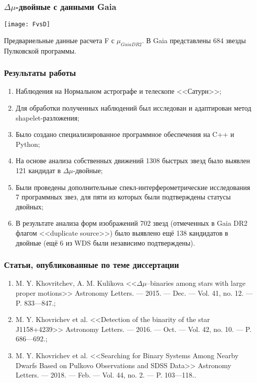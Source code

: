 \begin{frame}
\frametitle{$\Delta\mu$-двойные с данными Gaia}
\begin{center}
	\texttt{[image: FvsD]}
\end{center}
{\footnotesize
	Предвариельные данные расчета F с $\mu_{Gaia DR2}$.  В Gaia представлены 684 звезды Пулковской программы.
}
\end{frame}

\begin{frame}
\frametitle{Результаты работы}
{\footnotesize
\begin{enumerate}
\item Наблюдения на Нормальном астрографе и телескопе <<Сатурн>>;
\item Для обработки полученных наблюдений был исследован и адаптирован метод shapelet-разложения;
\item Было создано специализированное программное обеспечения на C++ и Python;
\item На основе анализа собственных движений 1308 быстрых звезд было выявлен 121 кандидат в $\Delta\mu$-двойные;
\item Были проведены дополнительные спекл-интерферометрические исследования 7 программных звез, для пяти из которых были подтверждены статусы двойных;
\item В результате анализа форм изображений 702 звезд (отмеченных в Gaia DR2 флагом <<duplicate source>>) было выявлено ещё 138 кандидатов в двойные (ещё 6 из WDS были независимо подтверждены).
\end{enumerate}
}
\end{frame}

\begin{frame}
\frametitle{Статьи, опубликованные по теме диссертации}
{\footnotesize
\begin{enumerate}
\item M. Y. Khovritchev, A. M. Kulikova <<$\Delta\mu$–binaries among stars with large proper motions>> Astronomy Letters. –– 2015. –– Dec. –– Vol. 41, no. 12. –– P. 833––847.;
\item M. Y. Khovrichev et al. <<Detection of the binarity of the star J1158+4239>> Astronomy Letters. –– 2016. –– Oct. –– Vol. 42, no. 10. –– P. 686––692.;
\item M. Y. Khovrichev et al. <<Searching for Binary Systems Among Nearby Dwarfs Based on Pulkovo Observations and SDSS Data>> Astronomy Letters. ––
2018. –– Feb. –– Vol. 44, no. 2. –– P. 103––118..
\end{enumerate}
}
\end{frame}

